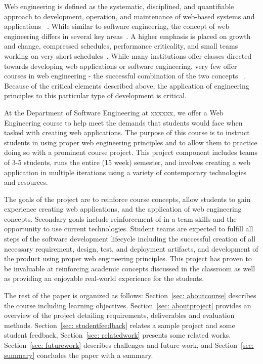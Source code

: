 \documentclass{sig-alternate}
\newif\ifisnopii
\begin{document}
Web engineering is defined as the systematic, disciplined, and quantifiable approach to development, operation, and maintenance of web-based systems and applications ~\cite{Schummer:2005:TDS:1149293.1149369,Mendes:2003:ACF:858403.858417,Reif:2005:WWE:1060745.1060849}. While similar to software engineering, the concept of web engineering differs in several key areas~\cite{Ginige:2002:WEM:568760.568885}. A higher emphasis is placed on growth and change, compressed schedules, performance criticality, and small teams working on very short schedules~\cite{Deshpande:2002:WE:2011098.2011101}. While many institutions offer classes directed towards developing web applications or software engineering, very few offer courses in web engineering - the successful combination of the two concepts ~\cite{tufts_webengineering,csun_webengineering}. Because of the critical elements described above, the application of engineering principles to this particular type of development is critical.

At the Department of Software Engineering at \ifisnopii the Rochester Institute of Technology (RIT)\else xxxxxx\fi, we offer a Web Engineering course to help meet the demands that students would face when tasked with creating web applications. The purpose of this course is to instruct students in using proper web engineering principles and to allow them to practice doing so with a prominent course project. This project component includes teams of 3-5 students, runs the entire (15 week) semester, and involves creating a web application in multiple iterations using a variety of contemporary technologies and resources.

The goals of the project are to reinforce course concepts, allow students to gain experience creating web applications, and the application of web engineering concepts. Secondary goals include reinforcement of in a team skills and the opportunity to use current technologies. Student teams are expected to fulfill all steps of the software development lifecycle including the successful creation of all necessary requirement, design, test, and deployment artifacts, and development of the product using proper web engineering principles. This project has proven to be invaluable at reinforcing academic concepts discussed in the classroom as well as providing an enjoyable real-world experience for the students.

The rest of the paper is organized as follows: Section~\ref{sec: aboutcourse} describes the course including learning objectives. Section~\ref{sec: aboutproject} provides an overview of the project detailing requirements, deliverables and evaluation methods. Section~\ref{sec: studentfeedback} relates a sample project and some student feedback, Section~\ref{sec: relatedwork} presents some related works. Section~\ref{sec: futurework} describes challenges and future work, and Section~\ref{sec: summary} concludes the paper with a summary.
\end{document}
